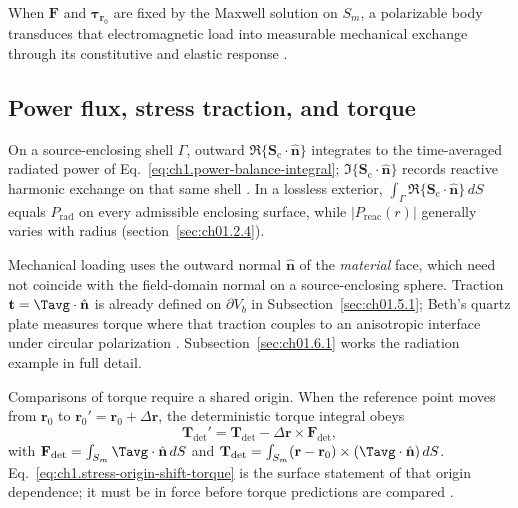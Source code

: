 When $\mathbf{F}$ and $\boldsymbol{\tau}_{\mathbf{r}_0}$ are fixed by the Maxwell solution on $S_m$, a polarizable body transduces that electromagnetic load into measurable mechanical exchange through its constitutive and elastic response \cite{beth1936,stratton1941}.

\subsection{Power flux, stress traction, and torque}
\label{sec:ch01.5.2}

On a source-enclosing shell $\Gamma$, outward $\Re\{\mathbf{S}_\mathrm{c}\cdot\hat{\mathbf{n}}\}$ integrates to the time-averaged radiated power of Eq.~\eqref{eq:ch1.power-balance-integral}; $\Im\{\mathbf{S}_\mathrm{c}\cdot\hat{\mathbf{n}}\}$ records reactive harmonic exchange on that same shell \cite{poynting1884,stratton1941}. In a lossless exterior, $\int_{\Gamma}\Re\{\mathbf{S}_\mathrm{c}\cdot\hat{\mathbf{n}}\}\,dS$ equals $P_{\mathrm{rad}}$ on every admissible enclosing surface, while $|P_{\mathrm{reac}}(r)|$ generally varies with radius (section~\ref{sec:ch01.2.4}).

Mechanical loading uses the outward normal $\hat{\mathbf{n}}$ of the \emph{material} face, which need not coincide with the field-domain normal on a source-enclosing sphere. Traction $\mathbf{t}=\Tavg\cdot\hat{\mathbf{n}}$ is already defined on $\partial V_b$ in Subsection~\ref{sec:ch01.5.1}; Beth's quartz plate measures torque where that traction couples to an anisotropic interface under circular polarization \cite{beth1936,stratton1941}. Subsection~\ref{sec:ch01.6.1} works the radiation example in full detail.

Comparisons of torque require a shared origin. When the reference point moves from $\mathbf{r}_0$ to $\mathbf{r}_0'=\mathbf{r}_0+\Delta\mathbf{r}$, the deterministic torque integral obeys
\begin{equation}
\label{eq:ch1.stress-origin-shift-torque}
\mathbf{T}_{\mathrm{det}}'
=
\mathbf{T}_{\mathrm{det}}-\Delta\mathbf{r}\times\mathbf{F}_{\mathrm{det}},
\end{equation}
with $\mathbf{F}_{\mathrm{det}}=\int_{S_m}\Tavg\cdot\hat{\mathbf{n}}\,dS$ and $\mathbf{T}_{\mathrm{det}}=\int_{S_m}(\mathbf{r}-\mathbf{r}_0)\times(\Tavg\cdot\hat{\mathbf{n}})\,dS$.
Eq.~\eqref{eq:ch1.stress-origin-shift-torque} is the surface statement of that origin dependence; it must be in force before torque predictions are compared \cite{stratton1941}.

